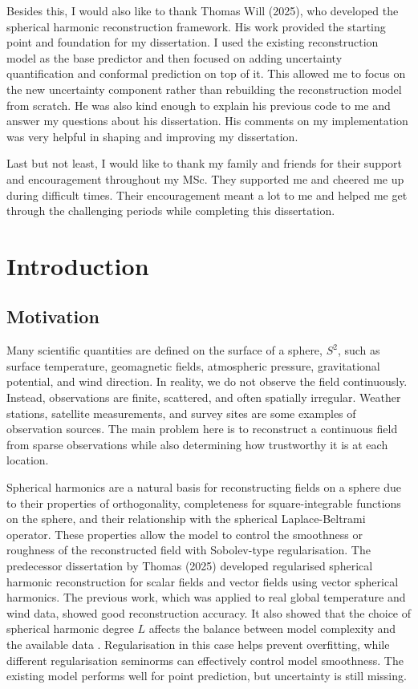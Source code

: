 \documentclass[11pt,a4paper]{report}
\begin{document}
Besides this, I would also like to thank Thomas Will (2025), who developed the spherical harmonic reconstruction framework. His work provided the starting point and foundation for my dissertation. I used the existing reconstruction model as the base predictor and then focused on adding uncertainty quantification and conformal prediction on top of it. This allowed me to focus on the new uncertainty component rather than rebuilding the reconstruction model from scratch. He was also kind enough to explain his previous code to me and answer my questions about his dissertation. His comments on my implementation was very helpful in shaping and improving my dissertation.

Last but not least, I would like to thank my family and friends for their support and encouragement throughout my MSc. They supported me and cheered me up during difficult times. Their encouragement meant a lot to me and helped me get through the challenging periods while completing this dissertation.

\tableofcontents
\listoffigures
\listoftables

\chapter{Introduction}
\label{ch:intro}

\section{Motivation}

Many scientific quantities are defined on the surface of a sphere, $S^2$, such as surface temperature, geomagnetic fields, atmospheric pressure, gravitational potential, and wind direction. In reality, we do not observe the field continuously. Instead, observations are finite, scattered, and often spatially irregular. Weather stations, satellite measurements, and survey sites are some examples of observation sources. The main problem here is to reconstruct a continuous field from sparse observations while also determining how trustworthy it is at each location.

Spherical harmonics are a natural basis for reconstructing fields on a sphere due to their properties of orthogonality, completeness for square-integrable functions on the sphere, and their relationship with the spherical Laplace-Beltrami operator. These properties allow the model to control the smoothness or roughness of the reconstructed field with Sobolev-type regularisation. The predecessor dissertation by Thomas (2025) developed regularised spherical harmonic reconstruction for scalar fields and vector fields using vector spherical harmonics. The previous work, which was applied to real global temperature and wind data, showed good reconstruction accuracy. It also showed that the choice of spherical harmonic degree $L$ affects the balance between model complexity and the available data \citep{thomas2025}. Regularisation in this case helps prevent overfitting, while different regularisation seminorms can effectively control model smoothness. The existing model performs well for point prediction, but uncertainty is still missing.
\end{document}
